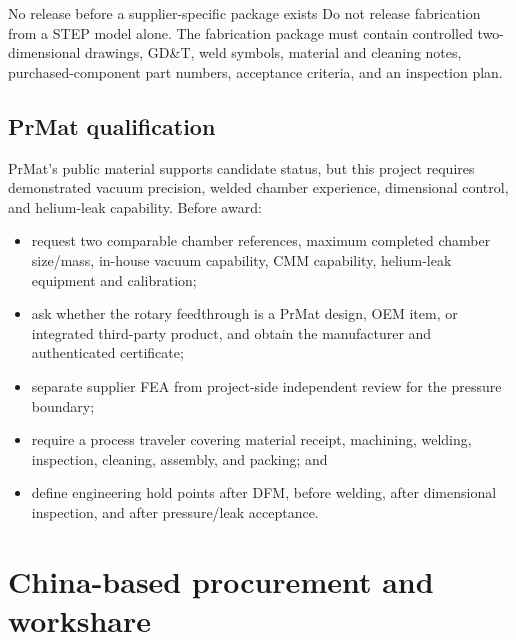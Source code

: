 \documentclass[10pt,letterpaper]{article}
\begin{document}
\begin{notebox}{No release before a supplier-specific package exists}
  Do not release fabrication from a STEP model alone. The fabrication package must contain
  controlled two-dimensional drawings, GD\&T, weld symbols, material and cleaning notes,
  purchased-component part numbers, acceptance criteria, and an inspection plan.
\end{notebox}

\subsection{PrMat qualification}

PrMat's public material supports candidate status, but this project requires demonstrated
vacuum precision, welded chamber experience, dimensional control, and helium-leak capability.
Before award:
\begin{itemize}
  \item request two comparable chamber references, maximum completed chamber size/mass,
    in-house vacuum capability, CMM capability, helium-leak equipment and calibration;
  \item ask whether the rotary feedthrough is a PrMat design, OEM item, or integrated
    third-party product, and obtain the manufacturer and authenticated certificate;
  \item separate supplier FEA from project-side independent review for the pressure boundary;
  \item require a process traveler covering material receipt, machining, welding, inspection,
    cleaning, assembly, and packing; and
  \item define engineering hold points after DFM, before welding, after dimensional inspection,
    and after pressure/leak acceptance.
\end{itemize}

\section{China-based procurement and workshare}
\end{document}
